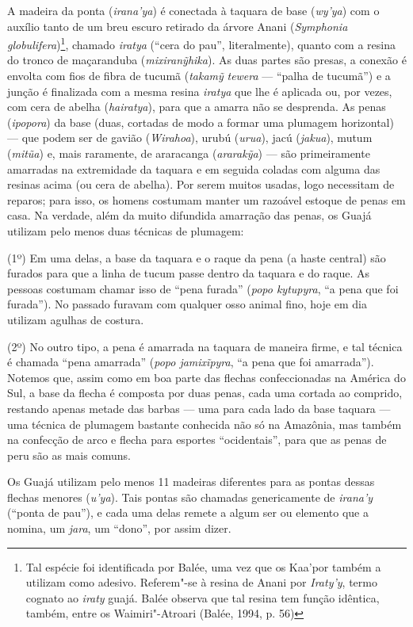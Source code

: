 A madeira da ponta (\emph{irana'ya}) é conectada à taquara de base
(\emph{wy'ya}) com o auxílio tanto de um breu escuro retirado da árvore
Anani (\emph{Symphonia globulifera})\footnote{Tal espécie foi
  identificada por Balée, uma vez que os Kaa'por também a utilizam como
  adesivo. Referem"-se à resina de Anani por \emph{Iraty'y}, termo
  cognato ao \emph{iraty} guajá. Balée observa que tal resina tem função
  idêntica, também, entre os Waimiri"-Atroari (Balée, 1994, p. 56)}, chamado
\emph{iratya} (``cera do pau'', literalmente), quanto com a resina do
tronco de maçaranduba (\emph{mixiranỹhika}). As duas partes são presas,
a conexão é envolta com fios de fibra de tucumã (\emph{takamỹ}
\emph{tewera} --- ``palha de tucumã'') e a junção é finalizada com a mesma
resina \emph{iratya} que lhe é aplicada ou, por vezes, com cera de
abelha (\emph{hairatya}), para que a amarra não se desprenda. As penas
(\emph{ipopora}) da base (duas, cortadas de modo a formar uma plumagem
horizontal) --- que podem ser de gavião (\emph{Wirahoa}), urubú
(\emph{urua}), jacú (\emph{jakua}), mutum (\emph{mitũa}) e, mais
raramente, de araracanga (\emph{ararakỹa}) --- são primeiramente amarradas
na extremidade da taquara e em seguida coladas com alguma das resinas
acima (ou cera de abelha). Por serem muitos usadas, logo necessitam de
reparos; para isso, os homens costumam manter um razoável estoque de
penas em casa. Na verdade, além da muito difundida amarração das penas,
os Guajá utilizam pelo menos duas técnicas de plumagem:

(1º) Em uma delas, a base da taquara e o raque da pena (a haste central)
são furados para que a linha de tucum passe dentro da taquara e do
raque. As pessoas costumam chamar isso de ``pena furada'' (\emph{popo
kytupyra}, ``a pena que foi furada''). No passado furavam com qualquer
osso animal fino, hoje em dia utilizam agulhas de costura.

(2º) No outro tipo, a pena é amarrada na taquara de maneira firme, e tal
técnica é chamada ``pena amarrada'' (\emph{popo jamixĩpyra}, ``a pena
que foi amarrada''). Notemos que, assim como em boa parte das flechas
confeccionadas na América do Sul, a base da flecha é composta por duas
penas, cada uma cortada ao comprido, restando apenas metade das barbas ---
uma para cada lado da base taquara --- uma técnica de plumagem bastante
conhecida não só na Amazônia, mas também na confecção de arco e flecha
para esportes ``ocidentais'', para que as penas de peru são as mais
comuns.


Os Guajá utilizam pelo menos 11 madeiras diferentes para as pontas
dessas flechas menores (\emph{u'ya}). Tais pontas são chamadas
genericamente de \emph{irana'y} (``ponta de pau''), e cada uma delas
remete a algum ser ou elemento que a nomina, um \emph{jara}, um
``dono'', por assim dizer.

